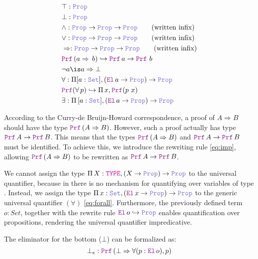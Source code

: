 \begin{definition}
\begin{align}
& \top : \prop \\
& \bot : \prop \\
& \land : \prop \ra \prop \ra \prop \qquad \text{(written inﬁx)} \\
& \lor : \prop \ra \prop \ra \prop \qquad \text{(written inﬁx)} \\
& \Rightarrow : \prop \ra \prop \ra \prop \qquad \text{(written inﬁx)} \\
&  \prf\,(a \Rightarrow\,b) \re \prf\, a \ra \prf\,\,b \label{eq:imp}\\
& \neg a \is a \Rightarrow \bot \\
& \forall : \Pi {[a: \set]}, (\el\, a \ra \prop) \ra \prop \label{eq:forall}\\
& \prf{}(\forall\,p) \re \Pi\, x, \prf{(p~x)}\\
& \exists : \Pi\, {[a: \set]}, (\el\, a \ra \prop) \ra \prop
\end{align}
\end{definition}

According to the Curry-de Bruijn-Howard correspondence, a proof of $A \Rightarrow B$ should have the type $\prf\,(A \Rightarrow B)$.
However, such a proof actually has type $\prf\,A \ra \prf\,B$. This means that the types $\prf\,(A \Rightarrow B)$ and $\prf\,A \ra \prf\,B$ must be identiﬁed.
To achieve this, we introduce the rewriting rule \cref{eq:imp}, allowing $\prf\,(A \Rightarrow B)$ to be rewritten as $\prf\,A \ra \prf\,B$.

We cannot assign the type $\Pi\,X: \type, (X \ra \prop) \ra \prop$ to the universal quantifier, because in \lpm{} there is no mechanism for quantifying over variables of type \type.
Instead, we assign the type $\Pi\,x:\set{},(\el\,x \ra \prop) \ra \prop$ to the generic universal quantiﬁer $(\forall)$ \cref{eq:forall}.
Furthermore, the previously defined term $o: Set$, together with the rewrite rule $\el\,o\index{o} \hookrightarrow \prop$ enables quantification over propositions, rendering the universal quantifier impredicative.

\begin{example}
The eliminator for the bottom ($\bot$) can be formalized as:
\[ \bot_e : \prf\,(\bot \Rightarrow \forall (p: \el\,o), p) \]
\end{example}

